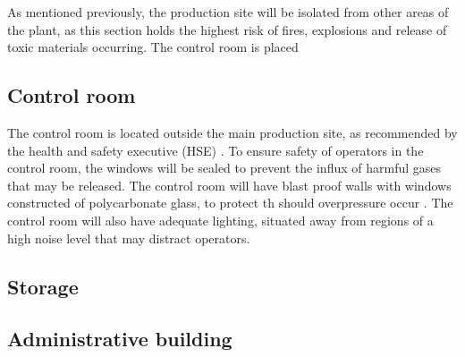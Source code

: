 As mentioned previously, the production site will be isolated from other areas of the plant, as this section holds the highest risk of fires, explosions  and release of toxic materials occurring. The control room is placed 

\subsection{Control room}

The control room is located outside the main production site, as recommended by the health and safety executive (HSE) \cite{health_and_safety_executive_control_nodate}. To ensure safety of operators in the control room, the windows will be sealed to prevent the influx of harmful gases that may be released. The control room will have blast proof walls with windows constructed of polycarbonate glass, to protect th should overpressure occur \cite{health_and_safety_executive_control_nodate}. The control room will also have adequate lighting, situated away from regions of a high noise level that may distract operators. 








\subsection{Storage}

\subsection{Administrative building}
